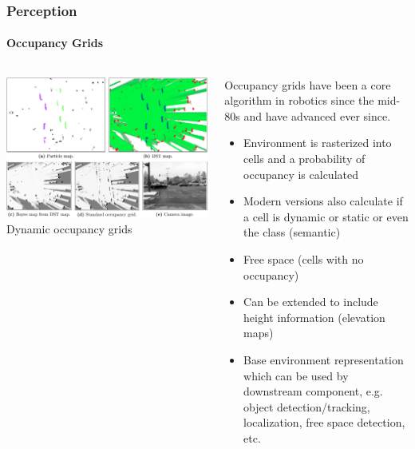 {\begin{frame}
\frametitle{Perception}
\framesubtitle{Occupancy Grids}
\begin{columns}[]
    \begin{column}{.5\textwidth}
        \centering
        \includegraphics[width=\textwidth]{images/tanzmeister_dynamic_grids.png}\\
        \tiny{Dynamic occupancy grids \cite{TanzmeisterDissertation2016}}
    \end{column}
    \begin{column}{.5\textwidth}
        \footnotesize
        Occupancy grids have been a core algorithm in robotics since the
        mid-80s \cite{Moravec1985-ef} and have advanced ever since.
        \begin{itemize}
            \item Environment is rasterized into cells and a probability of
                occupancy is calculated
            \item Modern versions also calculate if a cell is dynamic or static
                or even the class (semantic)
            \item Free space (cells with no occupancy)
            \item Can be extended to include height information (elevation maps)
            \item Base environment representation which can be used by downstream
                component, e.g. object detection/tracking, localization, free space
                detection, etc.
        \end{itemize}
    \end{column}
\end{columns}
\end{frame}

}
